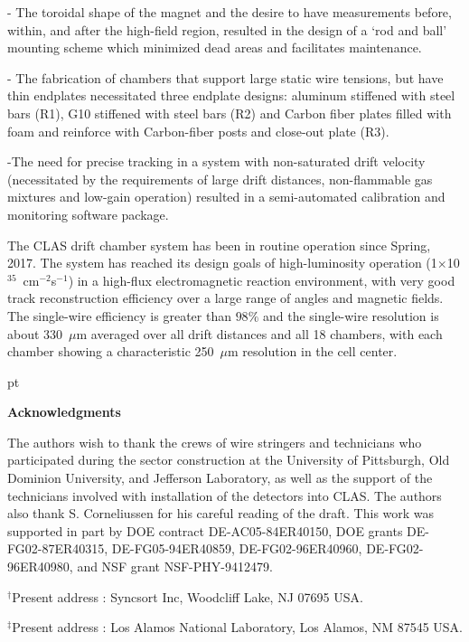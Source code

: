 \noindent
- The toroidal shape of the magnet and the desire to have measurements before, within, 
and after the high-field region, resulted in the design of a `rod and ball' mounting scheme
which minimized dead areas and facilitates maintenance.

\noindent
- The fabrication of chambers that support large static wire tensions, but have thin 
endplates necessitated three endplate designs: aluminum stiffened with steel bars (R1),
G10 stiffened with steel bars (R2) and Carbon fiber plates filled with foam and reinforce
with Carbon-fiber posts and close-out plate (R3). 

\noindent
-The need for precise tracking in a system with non-saturated drift velocity 
(necessitated by the requirements of large drift distances, non-flammable gas mixtures 
and low-gain operation) resulted in a semi-automated calibration and monitoring software 
package.

\vskip 10pt
The CLAS drift chamber system has been in routine operation since Spring, 2017. 
The system has reached its design goals of 
high-luminosity operation (1$\times$10$^{35}$~cm$^{-2}$s$^{-1}$) in a 
high-flux electromagnetic reaction environment, with very good track 
reconstruction efficiency over a large range of angles and 
magnetic fields.  The single-wire efficiency is greater than $98\%$ and the
single-wire resolution is about 330~$\mu$m averaged over all drift distances and
all 18 chambers, with each chamber showing a characteristic 250~$\mu$m resolution 
in the cell center.

 pt

{\large{\bf Acknowledgments}}

\vskip 10pt

The authors wish to thank the crews of wire stringers and technicians who 
participated during the sector construction at the University of Pittsburgh,
Old Dominion University, and Jefferson Laboratory, as well as the support of 
the technicians involved with installation of the detectors into CLAS.  The
authors also thank S. Corneliussen for his careful reading of the draft.  This
work was supported in part by DOE contract DE-AC05-84ER40150, DOE grants 
DE-FG02-87ER40315, DE-FG05-94ER40859, DE-FG02-96ER40960, DE-FG02-96ER40980, 
and NSF grant NSF-PHY-9412479.

\vskip 10pt

\noindent
$^{\dagger}$Present address : Syncsort Inc, Woodcliff Lake, NJ 07695 USA.

\noindent
$^{\ddagger}$Present address : Los Alamos National Laboratory, Los Alamos, NM
87545 USA.


